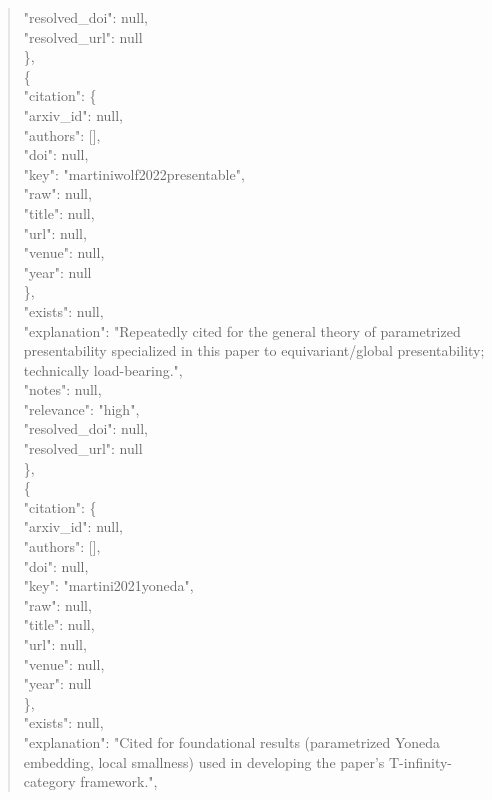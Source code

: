 \documentclass[11pt]{article}
\begin{document}
\begin{quote}
      "resolved\_doi": null,\\
      "resolved\_url": null\\
    \},\\
    \{\\
      "citation": \{\\
        "arxiv\_id": null,\\
        "authors": [],\\
        "doi": null,\\
        "key": "martiniwolf2022presentable",\\
        "raw": null,\\
        "title": null,\\
        "url": null,\\
        "venue": null,\\
        "year": null\\
      \},\\
      "exists": null,\\
      "explanation": "Repeatedly cited for the general theory of parametrized presentability specialized in this paper to equivariant/global presentability; technically load-bearing.",\\
      "notes": null,\\
      "relevance": "high",\\
      "resolved\_doi": null,\\
      "resolved\_url": null\\
    \},\\
    \{\\
      "citation": \{\\
        "arxiv\_id": null,\\
        "authors": [],\\
        "doi": null,\\
        "key": "martini2021yoneda",\\
        "raw": null,\\
        "title": null,\\
        "url": null,\\
        "venue": null,\\
        "year": null\\
      \},\\
      "exists": null,\\
      "explanation": "Cited for foundational results (parametrized Yoneda embedding, local smallness) used in developing the paper's T-infinity-category framework.",\\

\end{quote}
\end{document}
